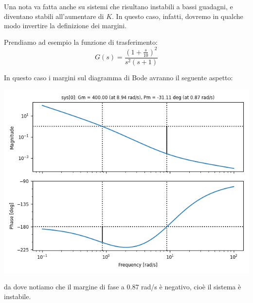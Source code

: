 \documentclass[a4paper,11pt]{article}
\begin{document}
\par\medskip

Una nota va fatta anche su sistemi che risultano instabili a bassi guadagni, e diventano stabili all'aumentare di $K$.
In questo caso, infatti, dovremo in qualche modo invertire la definizione dei margini.

Prendiamo ad esempio la funzione di trasferimento:
$$
G(s) = \frac{\left(1 + \frac{s}{10}\right)^2}{s^2 (s + 1)}
$$

\noindent

\begin{minipage}{\textwidth}

	In questo caso i margini sul diagramma di Bode avranno il seguente aspetto:
	\begin{center}
		\includegraphics[scale=0.75]{../figures/bode_margin_weird.png}
	\end{center}

\end{minipage}

da dove notiamo che il margine di fase a $0.87$ rad/s è negativo, cioè il sistema è instabile.
\end{document}
